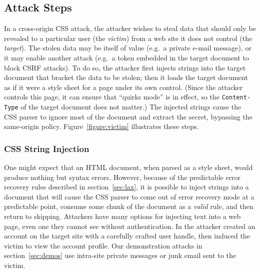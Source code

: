 \documentclass{acm_proc_article-sp}
\begin{document}
\subsection{Attack Steps}
In a cross-origin CSS attack, the attacker wishes to steal data that
should only be revealed to a particular user (the \emph{victim}) from
a web site it does not control (the \emph{target}).  The stolen data
may be itself of value (e.g.\ a private e-mail message), or it may
enable another attack (e.g.\ a token embedded in the target document
to block CSRF attacks).  To do so, the attacker first injects strings
into the target document that bracket the data to be stolen; then it
loads the target document as if it were a style sheet for a page under
its own control.  (Since the attacker controls this page, it can
ensure that “quirks mode” is in effect, so the \texttt{Content-Type}
of the target document does not matter.)  The injected strings cause
the CSS parser to ignore most of the document and extract the secret,
bypassing the same-origin policy.  Figure~\ref{figure:victim}
illustrates these steps.

\subsubsection{CSS String Injection}
One might expect that an HTML document, when parsed as a style sheet,
would produce nothing but syntax errors.  However, because of the
predictable error recovery rules described in section~\ref{sec:lax},
it is possible to inject strings into a document that will cause the
CSS parser to come out of error recovery mode at a predictable point,
consume some chunk of the document as a \emph{valid} rule, and then
return to skipping.  Attackers have many options for injecting text
into a web page, even one they cannot see without authentication.  In
\cite{cssxss08} the attacker created an account on the target site
with a carefully crafted user handle, then induced the victim to view
the account profile.  Our demonstration attacks in
section~\ref{sec:demos} use intra-site private messages or junk
email sent to the victim.
\end{document}
